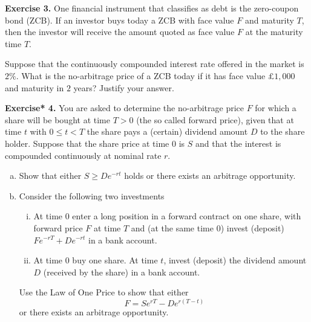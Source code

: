 \documentclass[11pt,a4paper]{report}
\begin{document}
    \textbf{Exercise 3.} One financial instrument that classifies as debt is the zero-coupon bond (ZCB). If an investor buys today a ZCB with face value $F$ and maturity $T$, then the investor will receive the amount quoted as face value $F$ at the maturity time $T$.\par 
    Suppose that the continuously compounded interest rate offered in the market is $2\%$. What is the no-arbitrage price of a ZCB today if it has face value $\pounds 1,000$ and maturity in $2$ years? Justify your answer.\par 
    \textbf{Exercise* 4.} You are asked to determine the no-arbitrage price $F$ for which a share will be bought at time $T > 0$ (the so called forward price), given that at time $t$ with $0 \leq t < T$ the share pays a (certain) dividend amount $D$ to the share holder. Suppose that the share price at time $0$ is $S$ and that the interest is compounded continuously at nominal rate $r$.
    \begin{enumerate}[(a)]
        \item Show that either $S \geq De^{-rt}$ holds or there exists an arbitrage opportunity.
        \item Consider the following two investments
        \begin{enumerate}[(i)]
            \item At time $0$ enter a long position in a forward contract on one share, with forward price $F$ at time $T$ and (at the same time $0$) invest (deposit) $Fe^{-rT}+De^{-rt}$ in a bank account.
            \item At time $0$ buy one share. At time $t$, invest (deposit) the dividend amount $D$ (received by the share) in a bank account.
        \end{enumerate}
        Use the Law of One Price to show that either
        $$
        F = Se^{rT}-De^{r(T-t)}
        $$
        or there exists an arbitrage opportunity.
    \end{enumerate}
\end{document}
